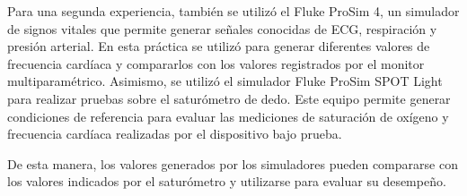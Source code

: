 Para una segunda experiencia, también se utilizó el Fluke ProSim 4, un simulador de signos vitales que permite generar señales conocidas de ECG, respiración y presión arterial. En esta práctica se utilizó para generar diferentes valores de frecuencia cardíaca y compararlos con los valores registrados por el monitor multiparamétrico. 
Asimismo, se utilizó el simulador Fluke ProSim SPOT Light para realizar pruebas sobre el saturómetro de dedo. Este equipo permite generar condiciones de referencia para evaluar las mediciones de saturación de oxígeno y frecuencia cardíaca realizadas por el dispositivo bajo prueba. 

De esta manera, los valores generados por los simuladores pueden compararse con los valores indicados por el saturómetro y utilizarse para evaluar su desempeño.